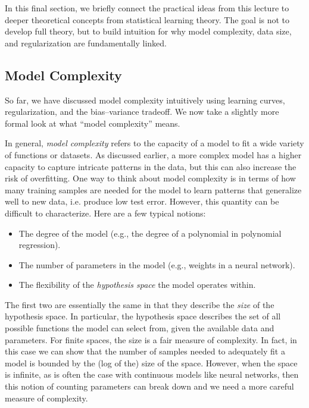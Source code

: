 \documentclass{article}
\begin{document}
In this final section, we briefly connect the practical ideas from this lecture 
to deeper theoretical concepts from statistical learning theory. The goal is not 
to develop full theory, but to build intuition for why model complexity, data size, 
and regularization are fundamentally linked.

\subsection{Model Complexity}
So far, we have discussed model complexity intuitively using learning curves, 
regularization, and the bias–variance tradeoff. We now take a slightly more 
formal look at what “model complexity” means.

In general, \textit{model complexity} refers to the capacity of a model to fit a wide variety of functions or datasets. As discussed earlier, a more complex model has a higher capacity to capture intricate patterns in the data, but this can also increase the risk of overfitting. One way to think about model complexity is in terms of how many training samples are needed for the model to learn patterns that generalize well to new data, i.e. produce low test error. However, this quantity can be difficult to characterize. Here are a few typical notions:

\begin{itemize}
    \item The degree of the model (e.g., the degree of a polynomial in polynomial regression).
    \item The number of parameters in the model (e.g., weights in a neural network).
    \item The flexibility of the \textit{hypothesis space} the model operates within.
\end{itemize}

The first two are essentially the same in that they describe the \textit{size} of the hypothesis space. In particular, the hypothesis space describes the set of all possible functions the model can select from, given the available data and parameters. For finite spaces, the size is a fair measure of complexity. In fact, in this case we can show that the number of samples needed to adequately fit a model is bounded by the (log of the) size of the space. However, when the space is infinite, as is often the case with continuous models like neural networks, then this notion of counting parameters can break down and we need a more careful measure of complexity.
\end{document}
